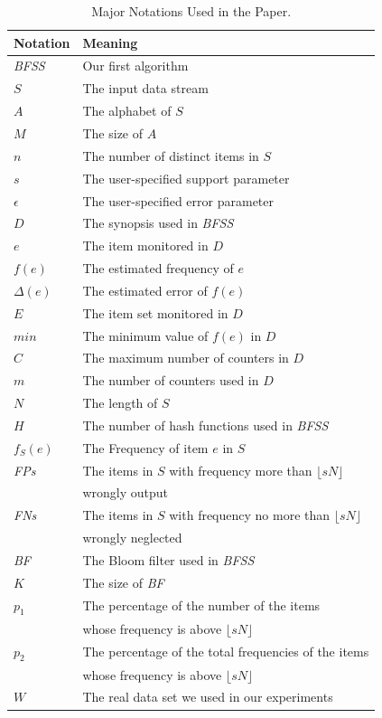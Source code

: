 \documentclass[conference]{IEEEtran}
\begin{document}
\begin{table}
	
    \caption{Major Notations Used in the Paper.}
   
	\begin{tabular}{ll}
		\hline	Notation  & Meaning\\ 
		\hline
		\emph{BFSS} & Our first algorithm\\	
		$S$ & The input data stream\\
		$A$ & The alphabet of $S$\\
		$M$ & The size of $A$\\
		$n$ & The number of distinct items in $S$\\
		$s$ & The user-specified support parameter\\
	    $\epsilon$ & The user-specified error parameter\\
		$D$ & The synopsis used in \emph{BFSS}\\
	    $e$ & The item monitored in $D$\\
	    $f(e)$ & The estimated frequency of $e$\\
	    $\Delta(e)$& The estimated error of $f(e)$\\
		$E$ & The item set monitored in $D$\\
		$min$ & The minimum value of $f(e)$ in $D$\\
		$C$ & The maximum number of counters in $D$\\
		$m$ & The number of counters used in $D$\\
		$N$ & The length of $S$\\
		$H$ & The number of hash functions used in \emph{BFSS}\\
		$f_S(e)$ & The Frequency of item $e$ in $S$\\ 
		\emph{FPs} &The items in $S$ with frequency more than $\lfloor sN\rfloor$\\& wrongly output\\
		\emph{FNs} & The items in $S$ with frequency no more than $\lfloor sN\rfloor$ \\&wrongly neglected\\
		\emph{BF}  &The Bloom filter used in \emph{BFSS}\\
		$K$ & The size of \emph{BF}\\
		$p_1$ & The percentage of the number of the items \\&whose frequency is above $\lfloor sN\rfloor$\\
		$p_2$ & The percentage of the total frequencies of the items \\&whose frequency is above $\lfloor sN\rfloor$\\
        $W$ & The real data set we used in our experiments\\
       \hline
	\end{tabular}
\label{tab:list}

\end{table}
\end{document}
